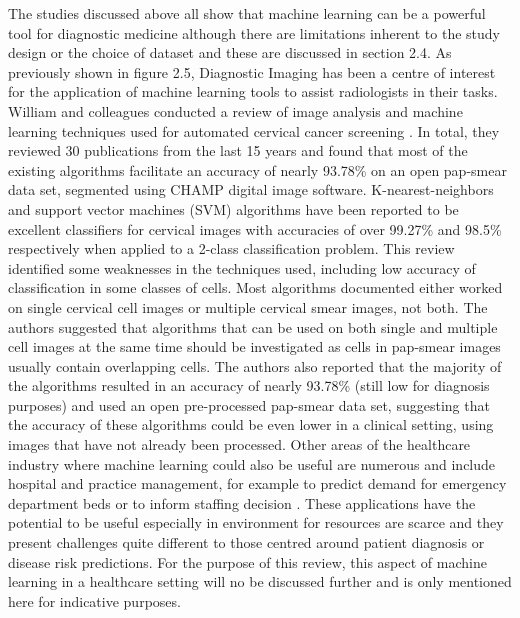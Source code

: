  The studies discussed above all show that machine learning can be a powerful tool for diagnostic medicine although there are limitations inherent to the study design or the choice of dataset and these are discussed in section 2.4.\newline
 As previously shown in figure 2.5, Diagnostic Imaging has been a centre of interest for the application of machine learning tools to assist radiologists in their tasks. William and colleagues conducted a review of image analysis and machine learning techniques used for automated cervical cancer screening \citep{William:2018ia}. In total, they reviewed 30 publications from the last 15 years and found that most of the existing algorithms facilitate an accuracy of nearly 93.78\% on an open pap-smear data set, segmented using CHAMP digital image software. K-nearest-neighbors and support vector machines (SVM) algorithms have been reported to be excellent classifiers for cervical images with accuracies of over 99.27\% and 98.5\% respectively when applied to a 2-class classification problem.\newline 
 This review identified some weaknesses in the techniques used, including low accuracy of classification in some classes of cells. Most algorithms documented either worked on single cervical cell images or multiple cervical smear images, not both. The authors suggested that algorithms that can be used on both single and multiple cell images at the same time should be investigated as cells in pap-smear images usually contain overlapping cells.\newline
 The authors also reported that the majority of the algorithms resulted in an accuracy of nearly 93.78\% (still low for diagnosis purposes) and used an open pre-processed pap-smear data set, suggesting that the accuracy of these algorithms could be even lower in a clinical setting, using images that have not already been processed.\newline 
Other areas of the healthcare industry where machine learning could also be useful are numerous and include hospital and practice management, for example to predict demand for emergency department beds or to inform staffing decision \citep{Callahan:2017bz, Tiwari:2014bq}. These applications have the potential to be useful especially in environment for resources are scarce and they present challenges quite different to those centred around patient diagnosis or disease risk predictions. For the purpose of this review, this aspect of machine learning in a healthcare setting will no be discussed further and is only mentioned here for indicative purposes.\newline


